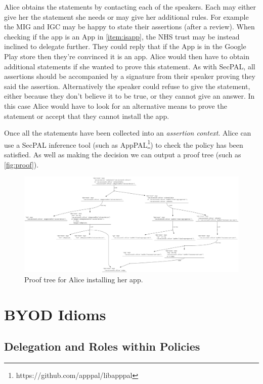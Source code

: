 \documentclass{llncs}
\begin{document}
Alice obtains the statements by contacting each of the speakers. 
Each may either give her the statement she needs or may give her additional rules.
For example the MIG and IGC may be happy to state their assertions (after a review).
When checking if the app is an App in \autoref{item:isapp}, the NHS trust may be instead inclined to delegate further.
They could reply that if the App is in the Google Play store then they're convinced it is an app.
Alice would then have to obtain additional statements if she wanted to prove this statement.
As with SecPAL, all assertions should be accompanied by a signature from their speaker proving they said the assertion.
Alternatively the speaker could refuse to give the statement, either because they don't believe it to be true, or they cannot give an answer.
In this case Alice would have to look for an alternative means to prove the statement or accept that they cannot install the app.

Once all the statements have been collected into an \emph{assertion context}.
Alice can use a SecPAL inference tool (such as AppPAL\footnote{https://github.com/apppal/libapppal}) to check the policy has been satisfied.
As well as making the decision we can output a proof tree (such as \autoref{fig:proof}).

\begin{figure}\centering
  \includegraphics[width=\linewidth]{figures/proof.png}
  \caption{Proof tree for Alice installing her app.}
  \label{fig:proof}
\end{figure}

\section{BYOD Idioms}

\subsection{Delegation and Roles within Policies}
\end{document}
